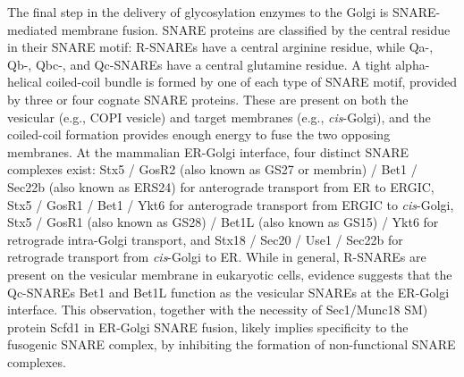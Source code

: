 The final step in the delivery of glycosylation enzymes to the Golgi is SNARE-mediated membrane fusion. SNARE proteins are classified by the central residue in their SNARE motif: R-SNAREs have a central arginine residue, while Qa-, Qb-, Qbc-, and Qc-SNAREs have a central glutamine residue. A tight alpha-helical coiled-coil bundle is formed by one of each type of SNARE motif, provided by three or four cognate SNARE proteins. These are present on both the vesicular (e.g., COPI vesicle) and target membranes (e.g., \emph{cis}-Golgi), and the coiled-coil formation provides enough energy to fuse the two opposing membranes\cite{hong_snares_2005,jahn_snares_2006}. At the mammalian ER-Golgi interface, four distinct SNARE complexes exist: Stx5 / GosR2 (also known as GS27 or membrin) / Bet1 / Sec22b (also known as ERS24) for anterograde transport from ER to ERGIC, Stx5 / GosR1 / Bet1 / Ykt6 for anterograde transport from ERGIC to \emph{cis}-Golgi, Stx5 / GosR1 (also known as GS28) / Bet1L (also known as GS15) / Ykt6 for retrograde intra-Golgi transport, and Stx18 / Sec20 / Use1 / Sec22b for retrograde transport from \emph{cis}-Golgi to ER\cite{dingjan_endosomal_2018,linders_stx5-mediated_2019,xu_subunit_2000,zhang_ykt6_2001,dascher_syntaxin_1994,hay_mammalian_1996,hay_localization_1998,paek_ers-24_1997,zhang_mammalian_1997,adolf_sec24c/d-isoformspecific_2016,malsam_organization_2011,burri_snare_2003,xu_gs15_2002,volchuk_countercurrent_2004,tai_participation_2004,linders_congenital_2020}. While in general, R-SNAREs are present on the vesicular membrane in eukaryotic cells\cite{jahn_snares_2006}, evidence suggests that the Qc-SNAREs Bet1 and Bet1L function as the vesicular SNAREs at the ER-Golgi interface\cite{linders_stx5-mediated_2019,xu_gs15_2002,linders_congenital_2020,banfield_snare-like_1995,parlati_topological_2000,parlati_distinct_2002}. This observation, together with the necessity of Sec1/Munc18 SM) protein Scfd1 in ER-Golgi SNARE fusion, likely implies specificity to the fusogenic SNARE complex, by inhibiting the formation of non-functional SNARE complexes\cite{rowe_role_1998,arac_three-dimensional_2005,bracher_structural_2002,peng_sly1_2002,yamaguchi_sly1_2002}.


